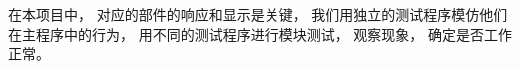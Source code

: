 \documentclass[../main.tex]{subfiles} %
\begin{document}
在本项目中，
对应的部件的响应和显示是关键，
我们用独立的测试程序模仿他们在主程序中的行为，
用不同的测试程序进行模块测试，
观察现象，
确定是否工作正常。
\end{document}
